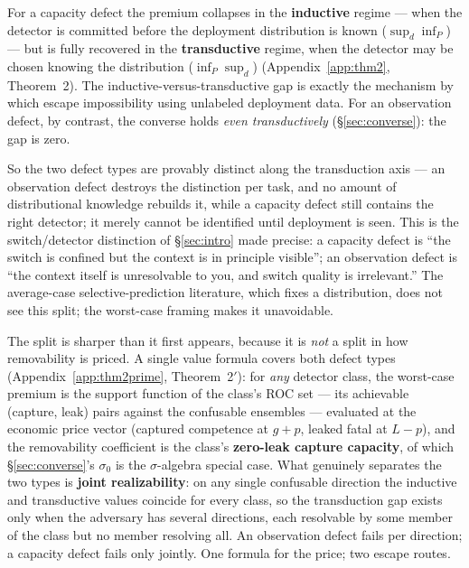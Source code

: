 \documentclass[11pt]{article}
\theoremstyle{plain}
\theoremstyle{definition}
\begin{document}
For a capacity defect the premium collapses in the \textbf{inductive} regime --- when
the detector is committed before the deployment distribution is known
($\sup_d \inf_P$) --- but is fully recovered in the \textbf{transductive} regime, when
the detector may be chosen knowing the distribution ($\inf_P \sup_d$)
(Appendix~\ref{app:thm2}, Theorem~2). The inductive-versus-transductive gap is exactly the
mechanism by which \citet{goldwasser2020} escape
impossibility using unlabeled deployment data. For an observation defect, by
contrast, the converse holds \emph{even transductively} (\S\ref{sec:converse}): the gap is zero.

So the two defect types are provably distinct along the transduction axis ---
an observation defect destroys the distinction per task, and no amount of
distributional knowledge rebuilds it, while a capacity defect still contains
the right detector; it merely cannot be identified until deployment is seen.
This is the switch/detector
distinction of \S\ref{sec:intro} made precise: a capacity defect is ``the switch is confined
but the context is in principle visible''; an observation defect is ``the
context itself is unresolvable to you, and switch quality is irrelevant.'' The
average-case selective-prediction literature, which fixes a distribution, does
not see this split; the worst-case framing makes it unavoidable.

The split is sharper than it first appears, because it is \emph{not} a split in
how removability is priced. A single value formula covers both defect types
(Appendix~\ref{app:thm2prime}, Theorem~2$'$): for \emph{any} detector class, the worst-case premium is
the support function of the class's ROC set --- its achievable (capture, leak)
pairs against the confusable ensembles --- evaluated at the economic price
vector (captured competence at $g+p$, leaked fatal at $L-p$), and the
removability coefficient is the class's \textbf{zero-leak capture capacity}, of
which \S\ref{sec:converse}'s $\sigma_0$ is the $\sigma$-algebra special case. What genuinely
separates the two types is \textbf{joint realizability}: on any single confusable
direction the inductive and transductive values coincide for every class, so
the transduction gap exists only when the adversary has several directions,
each resolvable by some member of the class but no member resolving all. An
observation defect fails per direction; a capacity defect fails only jointly.
One formula for the price; two escape routes.
\end{document}
